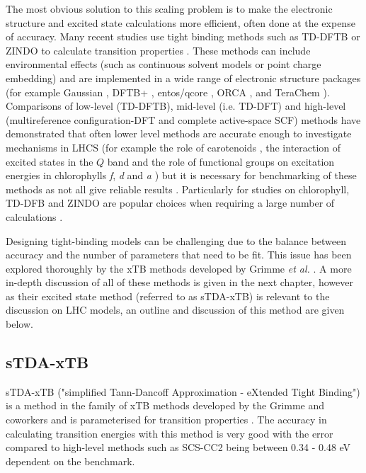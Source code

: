 The most obvious solution to this scaling problem is to make the electronic structure 
and excited state calculations more efficient, often done at the expense of accuracy.
Many recent studies use tight binding methods such as TD-DFTB or ZINDO to calculate
transition properties \cite{Jurinovich2015, Olbrich2010, Curutchet2011, Curutchet2012}. 
These methods can include environmental effects (such as continuous solvent models 
or point charge embedding) and are implemented in a wide range of electronic structure
packages (for example Gaussian \cite{Gaussian16}, DFTB+ \cite{Hourahine2020}, entos/qcore \cite{Manby2019},
ORCA \cite{Neese2012, Neese2018}, and TeraChem \cite{Seritan2020, Seritan2021}). 
Comparisons of low-level (TD-DFTB), mid-level (i.e. TD-DFT) and high-level (multireference
configuration-DFT and complete active-space SCF) methods have demonstrated that 
often lower level methods are accurate enough to investigate mechanisms in LHCS
(for example the role of carotenoids \cite{Andreussi2015}, the interaction of excited
states in the $Q$ band \cite{Hansen2019} and the role of functional groups on excitation
energies in chlorophylls \emph{f}, \emph{d} and \emph{a} \cite{Poddubnyy2021}) but
it is necessary for benchmarking of these methods as not all give reliable results \cite{Dahlbom2005}.
Particularly for studies on chlorophyll, TD-DFB and ZINDO are popular choices when
requiring a large number of calculations \cite{Cignoni2022}.

Designing tight-binding models can be challenging due to the balance between accuracy
and the number of parameters that need to be fit. This issue has been explored thoroughly 
by the xTB methods developed by Grimme \emph{et al.} \cite{Bannwarth2020}. A more
in-depth discussion of all of these methods is given in the next chapter, however
as their excited state method (referred to as sTDA-xTB) is relevant to the discussion
on LHC models, an outline and discussion of this method are given below.

\subsection{sTDA-xTB}
\label{subsec:stda_xtb}
sTDA-xTB ("simplified Tann-Dancoff Approximation - eXtended Tight Binding") is a
method in the family of xTB methods developed by the Grimme and coworkers and is
parameterised for transition properties \cite{Grimme2016}. The accuracy in calculating
transition energies with this method is very good with the error compared to high-level 
methods such as SCS-CC2 being between 0.34 - 0.48 eV dependent on the benchmark.

